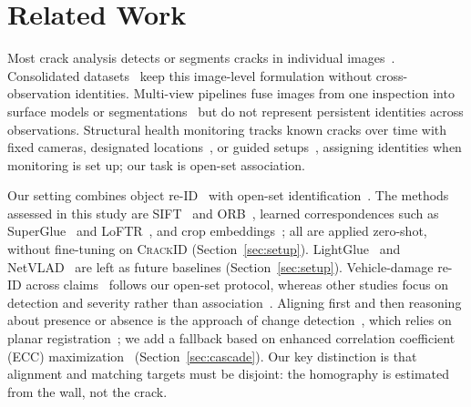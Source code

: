 \section{Related Work}
\label{sec:related}

Most crack analysis detects or segments cracks in individual images~\cite{zou2012cracktree,liu2019deepcrack,eisenbach2017gaps}.
Consolidated datasets~\cite{kulkarni2022crackseg9k,benz2024omnicrack30k} keep this image-level formulation without cross-observation identities.
Multi-view pipelines fuse images from one inspection into surface models or segmentations~\cite{benz2025crackstructures} but do not represent persistent identities across observations.
Structural health monitoring tracks known cracks over time with fixed cameras, designated locations~\cite{parente2022monitoring,harb2025multitemporal,sun2025perspective}, or guided setups~\cite{nec2019guide}, assigning identities when monitoring is set up; our task is open-set association.

Our setting combines object re-ID~\cite{qian2024reidtrends} with open-set identification~\cite{liao2014openset}.
The methods assessed in this study are SIFT~\cite{lowe2004sift} and ORB~\cite{rublee2011orb}, learned correspondences such as SuperGlue~\cite{sarlin2020superglue} and LoFTR~\cite{sun2021loftr}, and crop embeddings~\cite{zhou2019osnet,dosovitskiy2021vit,touvron2021deit,radford2021clip,oquab2024dinov2,jocher2023ultralytics}; all are applied zero-shot, without fine-tuning on \textsc{CrackID} (Section~\ref{sec:setup}).
LightGlue~\cite{lindenberger2023lightglue} and NetVLAD~\cite{arandjelovic2016netvlad} are left as future baselines (Section~\ref{sec:setup}).
Vehicle-damage re-ID across claims~\cite{maiano2023antifraud} follows our open-set protocol, whereas other studies focus on detection and severity rather than association~\cite{hasan2025review,perez2024assessment,mallios2023multiview}.
Aligning first and then reasoning about presence or absence is the approach of change detection~\cite{sakurada2015changedetection,alcantarilla2018street}, which relies on planar registration~\cite{hartley2004mvg,fischler1987ransac,barath2019magsac}; we add a fallback based on enhanced correlation coefficient (ECC) maximization~\cite{evangelidis2008ecc} (Section~\ref{sec:cascade}).
Our key distinction is that alignment and matching targets must be disjoint: the homography is estimated from the wall, not the crack.
